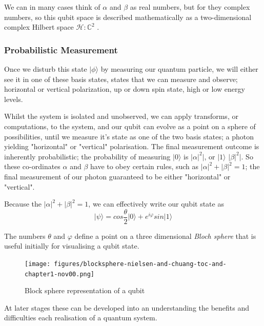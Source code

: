 We can in many cases think of $\alpha$ and $\beta$ as real numbers, but for they complex numbers, 
so this qubit space is described mathematically as a two-dimensional complex 
Hilbert space $\mathcal{H} : \mathbb{C}^2$ \cite{Preskill:2023} \cite{Nielsen:2010}.


\subsubsection{Probabilistic Measurement}

Once we disturb this state $\lvert\phi\rangle$ by measuring our quantum particle, 
we will either see it in one of these basis states, states that we can measure and observe; 
horizontal or vertical polarization, up or down spin state, high or low energy levels.  

Whilst the system is isolated and unobserved, we can apply transforms, or computations, to the system,
and our qubit can evolve as a point on a sphere of possibilities, until we measure it's state as one of the two basis states;
a photon yielding "horizontal" or "vertical" polarisation.  
The final measurement outcome is inherently probabilistic; 
the probability of measuring $\lvert0\rangle$ is $\lvert\alpha\lvert^2|$, or $\lvert1\rangle$ $\lvert\beta\lvert^2|$.
So these co-ordinates $\alpha$ and $\beta$ have to obey certain rules, 
such as $\lvert\alpha\lvert^2 + \lvert\beta\lvert^2 = 1$; 
the final measurement of our photon guaranteed to be either "horizontal" or "vertical".

Because the $\lvert\alpha\lvert^2 + \lvert\beta\lvert^2 = 1$, we can effectively write our qubit state as \cite{Nielsen:2010}
$$\lvert\psi\rangle = cos \frac{\theta}{2} \lvert0\rangle + e^{i\varphi} sin \lvert1\rangle $$

The numbers $\theta$ and $\varphi$ define a point on a three dimensional \emph{Bloch sphere} 
that is useful initially for visualising a qubit state.

\begin{figure}[ht] 
	\begin{adjustbox}{center}
		\texttt{[image: figures/blocksphere-nielsen-and-chuang-toc-and-chapter1-nov00.png]}
	\end{adjustbox}
	\caption{Block sphere representation of a qubit }
	\label{fig:block_sphere}
\end{figure}

At later stages these can be developed into an understanding the benefits and difficulties each 
realisation of a quantum system.

